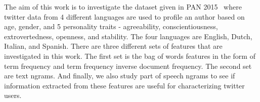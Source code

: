 \documentclass[a4paper]{llncs}
\begin{document}
The aim of this work is to investigate the dataset given in PAN 2015~\cite{rangel:2015} where twitter data from 4 different languages are used to profile an author based on age, gender, and 5 personality traits - agreeability, conscientiousness, extrovertedness, openness, and stability. The four languages are English, Dutch, Italian, and Spanish. There are three different sets of features that are investigated in this work. The first set is the bag of words features in the form of term frequency and term frequency inverse document frequency. The second set are text ngrams. And finally, we also study part of speech ngrams to see if information extracted from these features are useful for characterizing twitter users.
%
%
%
\end{document}
